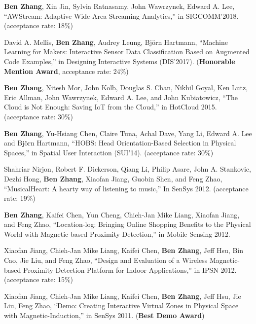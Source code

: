 
\begin{cventries}

  \begin{cvitems}

  \item {\bf Ben Zhang}, Xin Jin, Sylvia Ratnasamy, John Wawrzynek, Edward
    A. Lee, ``AWStream: Adaptive Wide-Area Streaming Analytics,'' in
    SIGCOMM'2018. (acceptance rate: 18\%)

  \item David A. Mellis, {\bf Ben Zhang}, Audrey Leung, Bj\"orn Hartmann,
    ``Machine Learning for Makers: Interactive Sensor Data Classification Based
    on Augmented Code Examples,'' in Designing Interactive Systems
    (DIS'2017). (\textbf{Honorable Mention Award}, acceptance rate: 24\%)

  \item {\bf Ben Zhang}, Nitesh Mor, John Kolb, Douglas S. Chan, Nikhil Goyal,
    Ken Lutz, Eric Allman, John Wawrzynek, Edward A. Lee, and John Kubiatowicz,
    ``The Cloud is Not Enough: Saving IoT from the Cloud,'' in HotCloud
    2015. (acceptance rate: 30\%)

  \item {\bf Ben Zhang}, Yu-Hsiang Chen, Claire Tuna, Achal Dave, Yang Li,
    Edward A. Lee and Bj\"orn Hartmann, ``HOBS: Head Orientation-Based Selection
    in Physical Spaces,'' in Spatial User Interaction (SUI'14). (acceptance
    rate: 30\%)

  \item Shahriar Nirjon, Robert F. Dickerson, Qiang Li, Philip Asare, John
    A. Stankovic, Dezhi Hong, {\bf Ben Zhang}, Xiaofan Jiang, Guobin Shen, and
    Feng Zhao, ``MusicalHeart: A hearty way of listening to music,'' In SenSys
    2012. (acceptance rate: 19\%)

  \item {\bf Ben Zhang}, Kaifei Chen, Yun Cheng, Chieh-Jan Mike Liang, Xiaofan
    Jiang, and Feng Zhao, ``Location-log: Bringing Online Shopping Benefits to
    the Physical World with Magnetic-based Proximity Detection,'' in Mobile
    Sensing 2012.

  \item Xiaofan Jiang, Chieh-Jan Mike Liang, Kaifei Chen, {\bf Ben Zhang}, Jeff
    Hsu, Bin Cao, Jie Liu, and Feng Zhao, ``Design and Evaluation of a Wireless
    Magnetic-based Proximity Detection Platform for Indoor Applications,'' in
    IPSN 2012. (acceptance rate: 15\%)

  \item Xiaofan Jiang, Chieh-Jan Mike Liang, Kaifei Chen, {\bf Ben Zhang}, Jeff
    Hsu, Jie Liu, Feng Zhao, ``Demo: Creating Interactive Virtual Zones in
    Physical Space with Magnetic-Induction,'' in SenSys 2011. ({\bf Best Demo
      Award})

  \end{cvitems}
\end{cventries}

